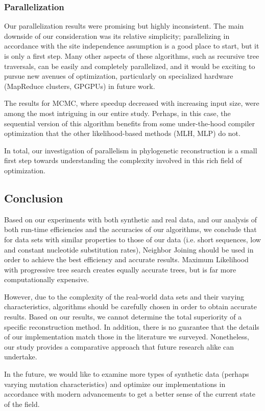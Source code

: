 \documentclass[10pt,twocolumn]{article}
\begin{document}
\subsubsection*{Parallelization}
Our parallelization results were promising but highly inconsistent. The main downside of our consideration was its relative simplicity; parallelizing in accordance with the site independence assumption is a good place to start, but it is only a first step. Many other aspects of these algorithms, such as recursive tree traversals, can be easily and completely parallelized, and it would be exciting to pursue new avenues of optimization, particularly on specialized hardware (MapReduce clusters, GPGPUs) in future work.

The results for MCMC, where speedup decreased with increasing input size, were among the most intriguing in our entire study. Perhaps, in this case, the sequential version of this algorithm benefits from some under-the-hood compiler optimization that the other likelihood-based methods (MLH, MLP) do not.

In total, our investigation of parallelism in phylogenetic reconstruction is a small first step towards understanding the complexity involved in this rich field of optimization.

\subsection*{Conclusion}
Based on our experiments with both synthetic and real data, and our analysis of both run-time efficiencies and the accuracies of our algorithms, we conclude that for data sets with similar properties to those of our data (i.e. short sequences, low and constant nucleotide substitution rates), Neighbor Joining should be used in order to achieve the best efficiency and accurate results. Maximum Likelihood with progressive tree search creates equally accurate trees, but is far more computationally expensive.

However, due to the complexity of the real-world data sets and their varying characteristics, algorithms should be carefully chosen in order to obtain accurate results. Based on our results, we cannot determine the total superiority of a specific reconstruction method. In addition, there is no guarantee that the details of our implementation match those in the literature we surveyed. Nonetheless, our study provides a comparative approach that future research alike can undertake.

In the future, we would like to examine more types of synthetic data (perhaps varying mutation characteristics) and optimize our implementations in accordance with modern advancements to get a better sense of the current state of the field.
\end{document}
